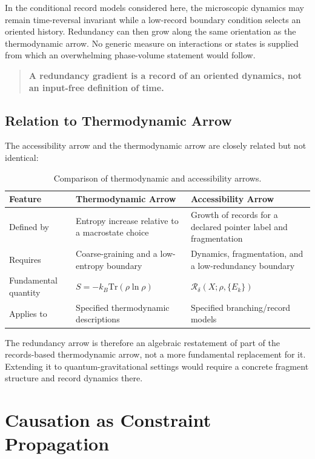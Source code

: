 \documentclass[12pt,a4paper,openany]{book}
\begin{document}
In the conditional record models considered here, the microscopic dynamics may remain time-reversal invariant while a low-record boundary condition selects an oriented history.  Redundancy can then grow along the same orientation as the thermodynamic arrow.  No generic measure on interactions or states is supplied from which an overwhelming phase-volume statement would follow.

\begin{quote}
\textbf{A redundancy gradient is a record of an oriented dynamics, not an input-free definition of time.}
\end{quote}

\subsection{Relation to Thermodynamic Arrow}

The accessibility arrow and the thermodynamic arrow are closely related but not identical:

\begin{table}[ht]
\centering
\small
\begin{tabular}{|P{3.5cm}|P{4.5cm}|P{4.5cm}|}
\hline
\textbf{Feature} & \textbf{Thermodynamic Arrow} & \textbf{Accessibility Arrow} \\
\hline
Defined by & Entropy increase relative to a macrostate choice & Growth of records for a declared pointer label and fragmentation \\
\hline
Requires & Coarse-graining and a low-entropy boundary & Dynamics, fragmentation, and a low-redundancy boundary \\
\hline
Fundamental quantity & $S = -k_B \text{Tr}(\rho \ln \rho)$ & $\mathcal{R}_\delta(X;\rho,\{E_k\})$ \\
\hline
Applies to & Specified thermodynamic descriptions & Specified branching/record models \\
\hline
\end{tabular}
\caption{Comparison of thermodynamic and accessibility arrows.}
\label{H-F-tab:arrows}
\end{table}

The redundancy arrow is therefore an algebraic restatement of part of the records-based thermodynamic arrow, not a more fundamental replacement for it.  Extending it to quantum-gravitational settings would require a concrete fragment structure and record dynamics there.

\section{Causation as Constraint Propagation}
\label{H-F-sec:causation}
\end{document}
